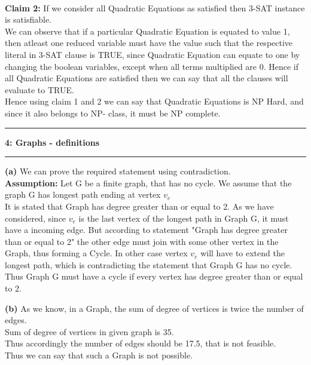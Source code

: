 \documentclass[11pt]{article}
\newcommand\question[2]{\vspace{.25in}\hrule\textbf{#1: #2}\vspace{.5em}\hrule\vspace{.10in}}
\renewcommand\part[1]{\vspace{.10in}\textbf{(#1)}}
\newcommand\assumption{\vspace{.10in}\textbf{Assumption: }}
\begin{document}
\\ {\bf Claim 2:} If we consider all Quadratic Equations as satisfied then 3-SAT instance is satisfiable.
\\ We can observe that if a particular Quadratic Equation is equated to value 1, then atleast one reduced variable must have the value such that the respective literal in 3-SAT clause is TRUE, since Quadratic Equation can equate to one by changing the boolean variables, except when all terms multiplied are 0. Hence if all Quadratic Equations are satisfied then we can say that all the clauses will evaluate to TRUE.
\\ Hence using claim 1 and 2 we can say that Quadratic Equations is NP Hard, and since it also belongs to NP- class, it must be NP complete. 
 
\question{4}{Graphs - definitions}
\part{a}
We can prove the required statement using contradiction.\\
\assumption Let G be a finite graph, that has no cycle. We assume that the graph G has longest path ending at vertex $v_e$\\
It is stated that Graph has degree greater than or equal to 2. As we have considered, since $v_e$ is the last vertex of the longest path in Graph G, it must have a incoming edge. But according to statement "Graph has degree greater than or equal to 2" the other edge must join with some other vertex in the Graph, thus forming a Cycle. In other case vertex $v_e$ will have to extend the longest path, which is contradicting the statement that Graph G has no cycle.\\
Thus Graph G must have a cycle if every vertex has degree greater than or equal to 2.
  
\part{b}
As we know, in a Graph, the sum of degree of vertices is twice the number of edges.\\
Sum of degree of vertices in given graph is 35.\\
Thus accordingly the number of edges should be 17.5, that is not feasible.\\
Thus we can say that such a Graph is not possible.
\end{document}
